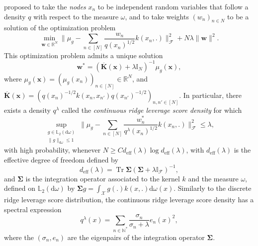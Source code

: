 \documentclass[twoside,11pt]{book}
\numberwithin{theorem}{chapter}
\numberwithin{definition}{chapter}
\numberwithin{proposition}{chapter}
\numberwithin{corollary}{chapter}
\numberwithin{example}{chapter}
\numberwithin{lemma}{chapter}
\numberwithin{assumption}{chapter}
\numberwithin{equation}{chapter}
\numberwithin{figure}{chapter}
\DeclareMathOperator{\Tr}{Tr}
\DeclareMathOperator{\eff}{\mathrm{eff}}
\DeclareMathOperator{\F}{\mathcal{F}}
\DeclareMathOperator{\X}{\mathcal{X}}
\begin{document}
\cite{Bac17} proposed to take the \emph{nodes} $x_{n}$ to be independent random variables that follow a density $q$ with respect to the measure $\omega$, and to take weights $(w_{n})_{n \in N}$ to be a solution of the optimization problem
\begin{equation}\label{eq:introduction_reg_problem_kernel_quadrature}
\min\limits_{ \bm{w}\in \mathbb{R}^{N}} \Big\|\mu_{g} - \sum\limits_{n \in [N]} \frac{w_{n}}{q(x_{n})^{1/2}}k(x_{n},.) \Big\|_{\F}^{2} + N \lambda \|\bm{w}\|^{2}.
\end{equation}
This optimization problem admits a unique solution 
\begin{equation}
\bm{w}^{*} = (\overline{\bm{K}}(\bm{x})+\lambda \mathbb{I}_{N})^{-1}\mu_{g}(\bm{x}),
\end{equation}
where $\mu_{g}(\bm{x}) = (\mu_{g}(x_{n}))_{n \in [N]} \in \mathbb{R}^{N}$, and $\overline{\bm{K}}(\bm{x}) = (q(x_{n})^{-1/2} k(x_{n},x_{n'}) q(x_{n'})^{-1/2})_{n,n' \in [N]}$. 
In particular, there exists a density $q^{\lambda}$ called the \emph{continuous ridge leverage score density} for which 
\begin{equation}
\sup\limits_{\substack{g \in \mathbb{L}_2(\mathrm{d}\omega)\\ \|g\|_{\mathrm{d}\omega} \leq 1}} \Big \|\mu_g - \sum\limits_{n \in [N]} \frac{w_{n}^{*}}{q^{\lambda}(x_{n})^{1/2}}k(x_{n},.) \Big \|_{\F}^{2} \leq \lambda, 
\end{equation}
with high probability, whenever $N \geq C d_{\eff}(\lambda) \log d_{\eff}(\lambda)$, with $d_{\eff}(\lambda)$ is the effective degree of freedom defined by
\begin{equation}
d_{\eff}(\lambda) = \Tr \bm{\Sigma}(\bm{\Sigma} + \lambda \mathbb{I}_{\F})^{-1},
\end{equation}
and $\bm{\Sigma}$ is the integration operator associated to the kernel $k$ and the measure $\omega$, defined on $\mathbb{L}_{2}(\mathrm{d}\omega)$ by $\bm{\Sigma} g = \int_{\X} g(.)k(x,.) \mathrm{d}\omega(x)$. Similarly to the discrete ridge leverage score distribution, the continuous ridge leverage score density has a spectral expression
\begin{equation}\label{eq:introduction_optimal_density}
q^{\lambda}(x) = \sum\limits_{n \in \mathbb{N}^{*}} \frac{\sigma_{n}}{\sigma_n + \lambda} e_{n}(x)^{2},
\end{equation} 
where the $(\sigma_{n},e_n)$ are the eigenpairs of the integration operator $\bm{\Sigma}$. 
\end{document}
